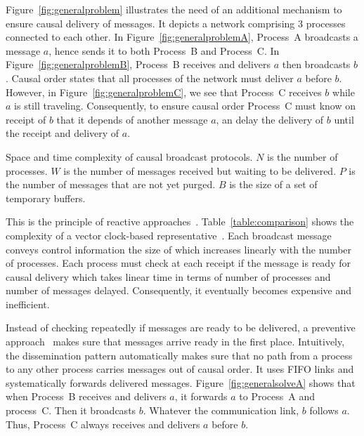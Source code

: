 Figure~\ref{fig:generalproblem} illustrates the need of an additional mechanism
to ensure causal delivery of messages. It depicts a network comprising 3
processes connected to each other. In Figure~\ref{fig:generalproblemA},
Process~A broadcasts a message $a$, hence sends it to both Process~B and
Process~C.  In Figure~\ref{fig:generalproblemB}, Process~B receives and delivers
$a$ then broadcasts $b$. Causal order states that all processes of the network
must deliver $a$ before $b$. However, in Figure~\ref{fig:generalproblemC}, we
see that Process~C receives $b$ while $a$ is still traveling. Consequently, to
ensure causal order Process~C must know on receipt of $b$ that it depends of
another message $a$, an delay the delivery of $b$ until the receipt and delivery
of $a$.

\begin{table}
  \caption{\label{table:comparison} Space and time complexity of causal
    broadcast protocols. 
    $N$ is the number of processes. 
    $W$ is the number of messages received but waiting to be delivered.
    $P$ is the number of messages that are not yet purged.
    $B$ is the size of a set of temporary buffers.}
  
\end{table}

This is the principle of reactive
approaches~\cite{almeida2008interval,fidge1988timestamps,hadzilacos1993fault,mattern1989virtual,mostefaoui2017probabilistic,singhal1992efficient}.
Table~\ref{table:comparison} shows the complexity of a vector clock-based
representative~\cite{schwarz1994detecting}.  Each broadcast message conveys
control information the size of which increases linearly with the number of
processes. Each process must check at each receipt if the message is ready for
causal delivery which takes linear time in terms of number of processes and
number of messages delayed. Consequently, 
it eventually becomes expensive and inefficient.

Instead of checking repeatedly if messages are ready to be delivered, a
preventive approach~\cite{friedman2004causal} makes sure that messages arrive
ready in the first place. Intuitively, the dissemination pattern automatically
makes sure that no path from a process to any other process carries messages out
of causal order. It uses FIFO links and systematically forwards delivered
messages. Figure~\ref{fig:generalsolveA} shows that when Process~B receives and
delivers $a$, it forwards $a$ to Process~A and process~C. Then it broadcasts
$b$. Whatever the communication link, $b$ follows $a$. Thus, Process~C always
receives and delivers $a$ before $b$.

